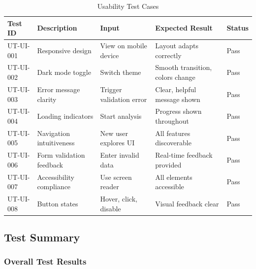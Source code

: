 \documentclass[12pt,a4paper]{article}
\begin{document}
    \begin{table}[H]
        \caption{Usability Test Cases}
        \begin{tabular}{|p{2cm}|p{4cm}|p{3cm}|p{3cm}|p{1.5cm}|}
            \hline
            \textbf{Test ID} & \textbf{Description} & \textbf{Input} & \textbf{Expected Result} & \textbf{Status} \\
            \hline
            UT-UI-001 & Responsive design & View on mobile device & Layout adapts correctly & Pass \\
            \hline
            UT-UI-002 & Dark mode toggle & Switch theme & Smooth transition, colors change & Pass \\
            \hline
            UT-UI-003 & Error message clarity & Trigger validation error & Clear, helpful message shown & Pass \\
            \hline
            UT-UI-004 & Loading indicators & Start analysis & Progress shown throughout & Pass \\
            \hline
            UT-UI-005 & Navigation intuitiveness & New user explores UI & All features discoverable & Pass \\
            \hline
            UT-UI-006 & Form validation feedback & Enter invalid data & Real-time feedback provided & Pass \\
            \hline
            UT-UI-007 & Accessibility compliance & Use screen reader & All elements accessible & Pass \\
            \hline
            UT-UI-008 & Button states & Hover, click, disable & Visual feedback clear & Pass \\
            \hline
        \end{tabular}
    \end{table}

    \subsection{Test Summary}

    \subsubsection{Overall Test Results}
\end{document}
